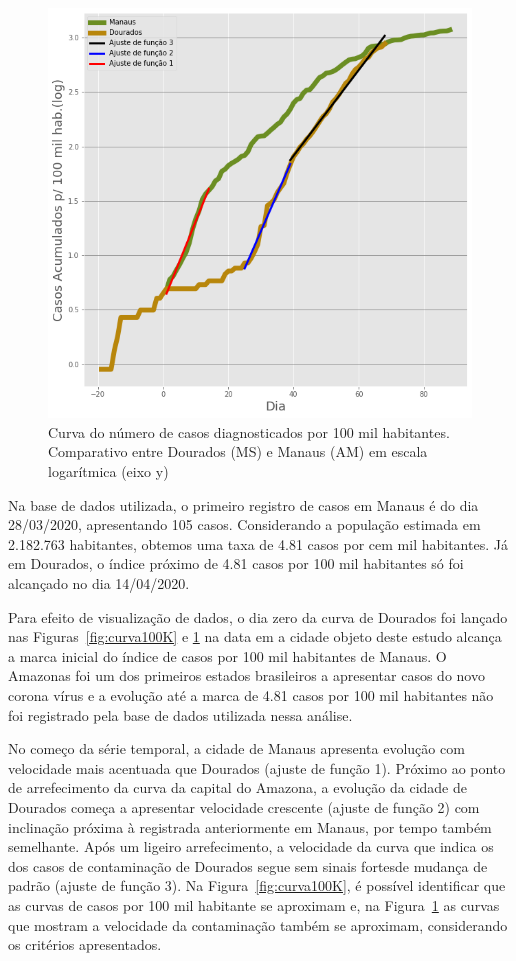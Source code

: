 \documentclass[12pt]{article}
\begin{document}
\begin{figure}[!htb]
  \centering
  \includegraphics[width=.6\textwidth]{figs/Dourados_Manaus_casos_log.png}
  \caption{Curva do número de casos diagnosticados por 100 mil habitantes. Comparativo entre Dourados (MS) e Manaus (AM) em escala logarítmica (eixo y)}
  \label{fig:curva100KLog}
  \end{figure}

Na base de dados utilizada, o primeiro registro de casos em Manaus é do dia 28/03/2020, apresentando 105 casos. Considerando a população estimada em 2.182.763 habitantes, obtemos uma taxa de 4.81 casos por cem mil habitantes. Já em Dourados, o índice próximo de 4.81 casos por 100 mil habitantes só foi alcançado no dia 14/04/2020.

Para efeito de visualização de dados, o dia zero da curva de Dourados foi lançado nas Figuras~\ref{fig:curva100K} e \ref{fig:curva100KLog} na data em a cidade objeto deste estudo alcança a marca inicial do índice de casos por 100 mil habitantes de Manaus. O Amazonas foi um dos primeiros estados brasileiros a apresentar casos do novo corona vírus e a evolução até a marca de 4.81 casos por 100 mil habitantes
não foi registrado pela base de dados utilizada nessa análise. 

No começo da série temporal, a cidade de Manaus apresenta evolução com velocidade mais acentuada que Dourados (ajuste de função 1). Próximo ao ponto de arrefecimento da curva da capital do Amazona, a evolução da cidade de Dourados começa a apresentar velocidade crescente (ajuste de função 2) com inclinação próxima à registrada anteriormente em Manaus, por tempo também semelhante. Após um ligeiro arrefecimento, a velocidade da curva que indica os dos casos de contaminação de Dourados segue sem sinais fortesde mudança de padrão (ajuste de função 3). Na Figura~\ref{fig:curva100K}, é possível identificar que as curvas de casos por 100 mil habitante se aproximam e, na Figura~\ref{fig:curva100KLog} as curvas que mostram a velocidade da contaminação também se aproximam, considerando os critérios apresentados.
\end{document}
